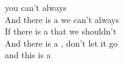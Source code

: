   you can't always  \\
And there is a  we can't always  \\
If there is a  that we shouldn't  \\
And there is a , don't let it go  \\
and this is a